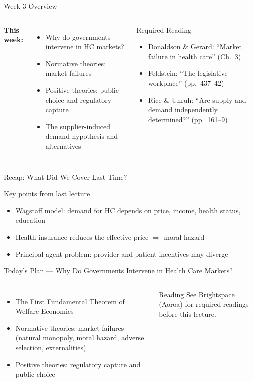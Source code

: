 \documentclass[aspectratio=169, 12pt]{beamer}
\newcommand{\recapslide}[1]{%
  \begin{frame}{Recap: What Did We Cover Last Time?}
    \begin{block}{Key points from last lecture}
      \begin{itemize}#1\end{itemize}
    \end{block}
  \end{frame}}
\newcommand{\planslide}[2]{%
  \begin{frame}{Today's Plan — #1}
    \begin{columns}
      \column{0.6\textwidth}
      \begin{itemize}#2\end{itemize}
      \column{0.38\textwidth}
      \begin{alertblock}{Reading}
        \footnotesize See Brightspace (Aoroa) for required readings before this lecture.
      \end{alertblock}
    \end{columns}
  \end{frame}}
\begin{document}
\begin{frame}{Week 3 Overview}
  \begin{columns}
      \textbf{This week:}
      \begin{itemize}
        \item Why do governments intervene in HC markets?
        \item Normative theories: market failures
        \item Positive theories: public choice and regulatory capture
        \item The supplier-induced demand hypothesis and alternatives
      \end{itemize}
      \begin{block}{Required Reading}
        {\small
        \begin{itemize}
          \item Donaldson \& Gerard: ``Market failure in health care'' (Ch.\ 3)
          \item Feldstein: ``The legislative workplace'' (pp.\ 437--42)
          \item Rice \& Unruh: ``Are supply and demand independently determined?'' (pp.\ 161--9)
        \end{itemize}}
      \end{block}
  \end{columns}
\end{frame}


\recapslide{
  \item Wagstaff model: demand for HC depends on price, income, health status, education
  \item Health insurance reduces the effective price $\Rightarrow$ moral hazard
  \item Principal-agent problem: provider and patient incentives may diverge
}

\planslide{Why Do Governments Intervene in Health Care Markets?}{
  \item The First Fundamental Theorem of Welfare Economics
  \item Normative theories: market failures (natural monopoly, moral hazard, adverse selection, externalities)
  \item Positive theories: regulatory capture and public choice
}
\end{document}
